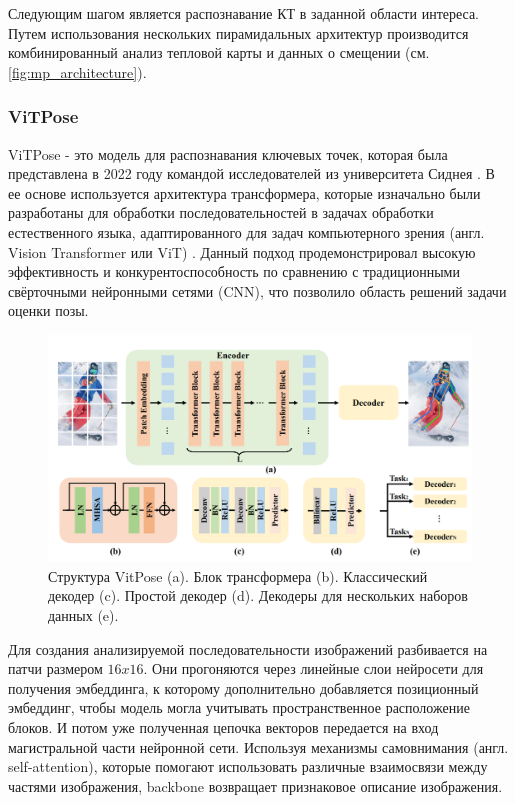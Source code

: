 Следующим шагом является распознавание КТ в заданной области интереса. Путем использования нескольких пирамидальных архитектур производится комбинированный анализ тепловой карты и данных о смещении (см. \autoref{fig:mp_architecture}).

\subsubsection*{ViTPose}

ViTPose - это модель для распознавания ключевых точек, которая была представлена в 2022 году командой исследователей из университета Сиднея \cite{vitpose}. В ее основе используется архитектура трансформера, которые изначально были разработаны для обработки последовательностей в задачах обработки естественного языка, адаптированного для задач компьютерного зрения (англ. Vision Transformer или ViT) \cite{vit}. Данный подход продемонстрировал высокую эффективность и конкурентоспособность по сравнению с традиционными свёрточными нейронными сетями (CNN), что позволило область решений задачи оценки позы.

\begin{figure}[h]
	\centering
	\includegraphics[width=.9\textwidth]{./images/vitpose_structure}
	\caption{Структура VitPose (a). Блок трансформера (b). Классический декодер (c). Простой декодер (d). Декодеры для нескольких наборов данных (e). \cite{vitpose}}
	\label{fig:vitpose_structure}
\end{figure}

Для создания анализируемой последовательности изображений разбивается на патчи размером $16x16$. Они прогоняются через линейные слои нейросети для получения эмбеддинга, к которому дополнительно добавляется позиционный эмбеддинг, чтобы модель могла учитывать пространственное расположение блоков. И потом уже полученная цепочка векторов передается на вход магистральной части нейронной сети. Используя механизмы самовнимания (англ. self-attention), которые помогают использовать различные взаимосвязи между частями изображения, backbone возвращает признаковое описание изображения.

